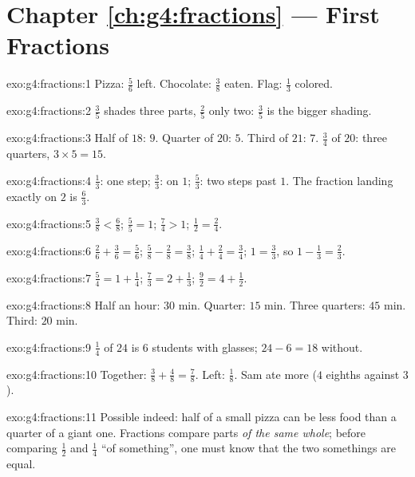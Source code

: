 \section*{Chapter \ref{ch:g4:fractions} --- First Fractions}

\begin{solution}{exo:g4:fractions:1}
Pizza: $\frac56$ left. Chocolate: $\frac38$ eaten. Flag: $\frac13$
colored.
\end{solution}

\begin{solution}{exo:g4:fractions:2}
$\frac35$ shades three parts, $\frac25$ only two: $\frac35$ is the
bigger shading.
\end{solution}

\begin{solution}{exo:g4:fractions:3}
Half of $18$: $9$. Quarter of $20$: $5$. Third of $21$: $7$.
$\frac34$ of $20$: three quarters, $3 \times 5 = 15$.
\end{solution}

\begin{solution}{exo:g4:fractions:4}
$\frac13$: one step; $\frac33$: on $1$; $\frac53$: two steps past
$1$. The fraction landing exactly on $2$ is $\frac63$.
\end{solution}

\begin{solution}{exo:g4:fractions:5}
$\frac38 < \frac68$; \quad $\frac55 = 1$; \quad $\frac74 > 1$;
\quad $\frac12 = \frac24$.
\end{solution}

\begin{solution}{exo:g4:fractions:6}
$\frac26 + \frac36 = \frac56$; \quad
$\frac58 - \frac28 = \frac38$; \quad
$\frac14 + \frac24 = \frac34$; \quad
$1 = \frac33$, so $1 - \frac13 = \frac23$.
\end{solution}

\begin{solution}{exo:g4:fractions:7}
$\frac54 = 1 + \frac14$; \quad
$\frac73 = 2 + \frac13$; \quad
$\frac92 = 4 + \frac12$.
\end{solution}

\begin{solution}{exo:g4:fractions:8}
Half an hour: $30$ min. Quarter: $15$ min. Three quarters: $45$
min. Third: $20$ min.
\end{solution}

\begin{solution}{exo:g4:fractions:9}
$\frac14$ of $24$ is $6$ students with glasses; $24 - 6 = 18$
without.
\end{solution}

\begin{solution}{exo:g4:fractions:10}
Together: $\frac38 + \frac48 = \frac78$. Left: $\frac18$. Sam ate
more ($4$ eighths against $3$).
\end{solution}

\begin{solution}{exo:g4:fractions:11}
Possible indeed: half of a small pizza can be less food than a
quarter of a giant one. Fractions compare parts \emph{of the same
whole}; before comparing $\frac12$ and $\frac14$ ``of something'',
one must know that the two somethings are equal.
\end{solution}
